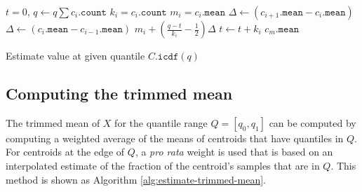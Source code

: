 \documentclass[11pt]{amsart}
\begin{document}
 \begin{algorithm}[b]
 \label{alg:estimate-quantile}
\SetNoFillComment
{}
$t = 0$, $q \gets q \sum c_i.\mathtt{count}$\;
 {
  $k_i = c_i.\mathtt{count}$\;
  $m_i = c_i.\mathtt{mean}$\;
   {
     {
      $\Delta \gets (c_{i+1}.\mathtt{mean} - c_i.\mathtt{mean})$\;
    }  {
      $\Delta \gets (c_{i}.\mathtt{mean} - c_{i-1}.\mathtt{mean})$\;
    } 
    \Return $m_i + \left( \frac {q-t} {k_i} - \frac 1 2 \right) \Delta$
  } 
  $t \gets t + k_i$
}
\Return $ c_m.\mathtt{mean}$
\caption{Estimate value at given quantile $C.\mathtt{icdf}(q)$}
\end{algorithm}

\subsection{Computing the trimmed mean}
The trimmed mean of $X$ for the quantile range $Q = [q_0,q_1]$ can be computed by computing a weighted average of the means of centroids that have quantiles in $Q$.  For centroids at the edge of $Q$, a {\em pro rata} weight is used that is based on an interpolated estimate of the fraction of the centroid's samples that are in $Q$.  This method is shown as Algorithm \ref {alg:estimate-trimmed-mean}.
\end{document}
